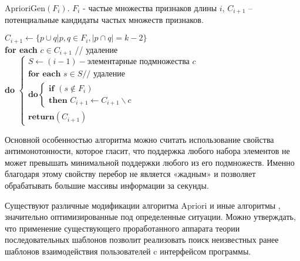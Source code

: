 

AprioriGen$(F_i)$. $F_i$ - частые множества признаков длины $i$, $C_{i+1}$ -- потенциальные кандидаты частых множеств признаков.

\noindent
$C_{i+1} \leftarrow \{p \cup q | p, q \in F_i,| p \cap q| = k-2 \}$ \\
\textbf{for each} $c \in C_{i+1}$ // удаление \\
\textbf{do}
$\begin{cases}
	S \leftarrow (i-1)-\text{элементарные подмножества } c\\
	\textbf{for each } s \in S \text{// удаление} \\
	\textbf{do} 
	\begin{cases}
		\textbf{if } (s \notin F_i)\\
		\textbf{then } C_{i+1} \leftarrow C_{i+1} \backslash c
	\end{cases} \\
	\textbf{return} (C_{i+1})
\end{cases}$

Основной особенностью алгоритма можно считать использование свойства антимонотонности, которое гласит, что поддержка любого набора элементов не может превышать минимальной поддержки любого из его подмножеств. Именно благодаря этому свойству перебор не является «жадным» и позволяет обрабатывать большие массивы информации за секунды.

Существуют различные модификации алгоритма Apriori и иные алгоритмы \cite{35}, значительно оптимизированные под определенные ситуации. Можно утверждать, что применение существующего проработанного аппарата теории последовательных шаблонов позволит реализовать поиск неизвестных ранее шаблонов взаимодействия пользователей c интерфейсом программы.

